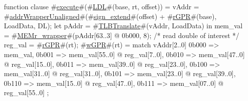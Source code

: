 function clause #\hyperref[zexecute]{execute}#(#\hyperref[zLDL]{LDL}#(base, rt, offset)) =
  {
    vAddr = #\hyperref[zaddrWrapperUnaligned]{addrWrapperUnaligned}#(#\hyperref[zsignzyextend]{sign\_extend}#(offset) + #\hyperref[zrGPR]{rGPR}#(base), LoadData, DL);
    let pAddr = #\hyperref[zTLBTranslate]{TLBTranslate}#(vAddr, LoadData) in
      {
        mem_val = #\hyperref[zMEMrzywrapper]{MEMr\_wrapper}#(pAddr[63..3] @ 0b000, 8); /* read double of interest */
        reg_val = #\hyperref[zrGPR]{rGPR}#(rt);
        #\hyperref[zwGPR]{wGPR}#(rt) = match vAddr[2..0]
              {
                0b000  => mem_val,
                0b001  => mem_val[55..0] @ reg_val[7..0],
                0b010  => mem_val[47..0] @ reg_val[15..0],
                0b011  => mem_val[39..0] @ reg_val[23..0],
                0b100  => mem_val[31..0] @ reg_val[31..0],
                0b101  => mem_val[23..0] @ reg_val[39..0],
                0b110  => mem_val[15..0] @ reg_val[47..0],
                0b111  => mem_val[07..0] @ reg_val[55..0]
              };
      }
  }
